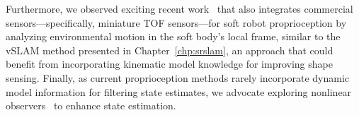 Furthermore, we observed exciting recent work~\citep{caroleo2025soft} that also integrates commercial sensors—specifically, miniature \gls{TOF} sensors—for soft robot proprioception by analyzing environmental motion in the soft body’s local frame, similar to the \gls{vSLAM} method presented in Chapter~\ref{chp:srslam}, an approach that could benefit from incorporating kinematic model knowledge for improving shape sensing.
Finally, as current proprioception methods rarely incorporate dynamic model information for filtering state estimates, we advocate exploring nonlinear observers~\citep{shao2023model} to enhance state estimation.

